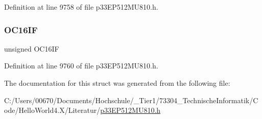 Definition at line 9758 of file p33\+E\+P512\+M\+U810.\+h.

\mbox{\label{structtag_i_f_s8_b_i_t_s_a3926b9ca60c7b177d7dfda25b6964a3a}} 
\subsubsection{\texorpdfstring{O\+C16\+IF}{OC16IF}}
{\footnotesize\ttfamily unsigned O\+C16\+IF}



Definition at line 9760 of file p33\+E\+P512\+M\+U810.\+h.



The documentation for this struct was generated from the following file\+:\begin{DoxyCompactItemize}
\item 
C\+:/\+Users/00670/\+Documents/\+Hochschule/\+\_\+\+Tier1/73304\+\_\+\+Technische\+Informatik/\+Code/\+Hello\+World4.\+X/\+Literatur/\hyperlink{p33_e_p512_m_u810_8h}{p33\+E\+P512\+M\+U810.\+h}\end{DoxyCompactItemize}
